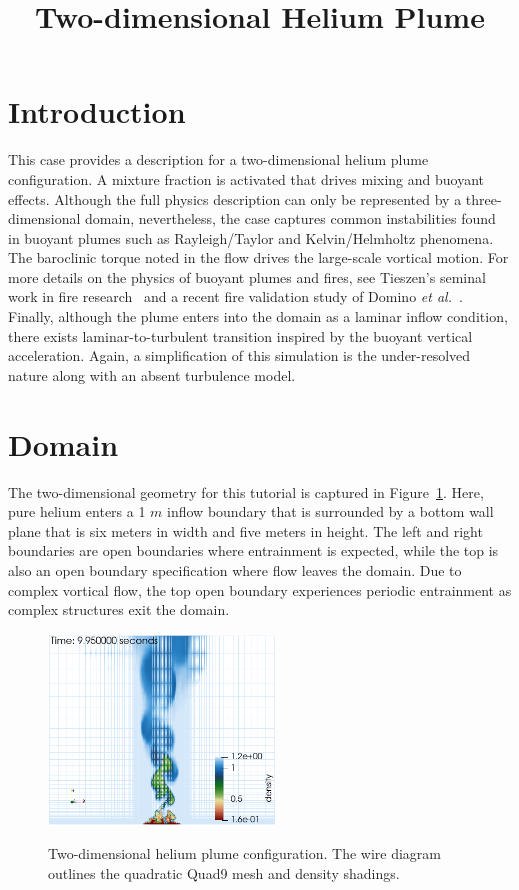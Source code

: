 \documentclass{article}
\title{Two-dimensional Helium Plume}
\date{}
\begin{document}
\maketitle

\section{Introduction}
This case provides a description for a two-dimensional helium plume 
configuration. A mixture fraction is activated that drives mixing and 
buoyant effects. Although the full physics description can only be 
represented by a three-dimensional domain, nevertheless, the case 
captures common instabilities found in buoyant plumes such as 
Rayleigh/Taylor and Kelvin/Helmholtz phenomena. The baroclinic 
torque noted in the flow drives the large-scale vortical motion. For 
more details on the physics of buoyant plumes and fires, 
see Tieszen's seminal work in fire research~\cite{tieszenReview} and 
a recent fire validation study of Domino \textit{et al.}~\cite{dominoPoF2021}.
Finally, although the plume enters into the domain as a laminar inflow 
condition, there exists laminar-to-turbulent transition inspired by 
the buoyant vertical acceleration. Again, a simplification of this 
simulation is the under-resolved nature along with an absent turbulence model.

\section{Domain}
The two-dimensional geometry for this tutorial is captured in 
Figure~\ref{fig:geom}. Here, pure helium enters a 1 $m$ inflow boundary
that is surrounded by a bottom wall plane that is six meters in width
and five meters in height. The left and right boundaries are open boundaries
where entrainment is expected, while the top is also an open boundary
specification where flow leaves the domain. Due to complex vortical flow,
the top open boundary experiences periodic entrainment as complex structures
exit the domain.

\begin{figure}[!htbp]
  \centering
  {
   \includegraphics[height=2.0in]{images/2d_quad9_helium_geom.png}
  }
  \caption{Two-dimensional helium plume configuration. The wire diagram 
outlines the quadratic Quad9 mesh and density shadings.}
  \label{fig:geom}
\end{figure}
\end{document}
